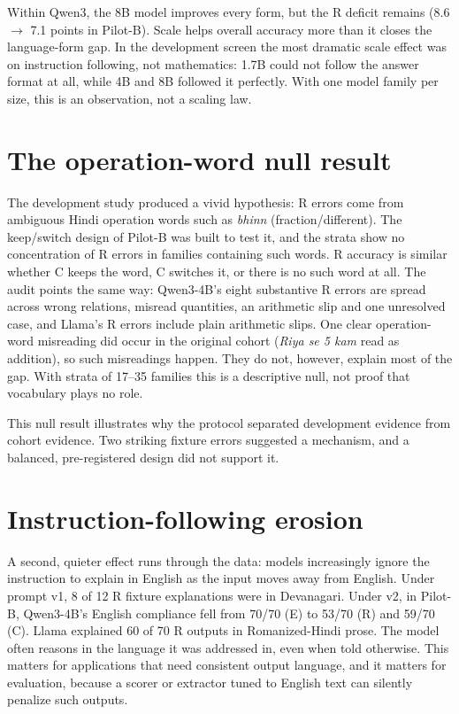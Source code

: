 \documentclass[12pt,a4paper,oneside]{report}
\renewcommand{\_}{\oldunderscore\allowbreak}
\begin{document}
Within Qwen3, the 8B model improves every form, but the R deficit remains (8.6 $\to$ 7.1 points in Pilot-B). Scale helps overall accuracy more than it closes the language-form gap. In the development screen the most dramatic scale effect was on instruction following, not mathematics: 1.7B could not follow the answer format at all, while 4B and 8B followed it perfectly. With one model family per size, this is an observation, not a scaling law.

\section{The operation-word null result}

The development study produced a vivid hypothesis: R errors come from ambiguous Hindi operation words such as \emph{bhinn} (fraction/different). The keep/switch design of Pilot-B was built to test it, and the strata show no concentration of R errors in families containing such words. R accuracy is similar whether C keeps the word, C switches it, or there is no such word at all. The audit points the same way: Qwen3-4B's eight substantive R errors are spread across wrong relations, misread quantities, an arithmetic slip and one unresolved case, and Llama's R errors include plain arithmetic slips. One clear operation-word misreading did occur in the original cohort (\emph{Riya se 5 kam} read as addition), so such misreadings happen. They do not, however, explain most of the gap. With strata of 17--35 families this is a descriptive null, not proof that vocabulary plays no role.

This null result illustrates why the protocol separated development evidence from cohort evidence. Two striking fixture errors suggested a mechanism, and a balanced, pre-registered design did not support it.

\section{Instruction-following erosion}

A second, quieter effect runs through the data: models increasingly ignore the instruction to explain in English as the input moves away from English. Under prompt v1, 8 of 12 R fixture explanations were in Devanagari. Under v2, in Pilot-B, Qwen3-4B's English compliance fell from 70/70 (E) to 53/70 (R) and 59/70 (C). Llama explained 60 of 70 R outputs in Romanized-Hindi prose. The model often reasons in the language it was addressed in, even when told otherwise. This matters for applications that need consistent output language, and it matters for evaluation, because a scorer or extractor tuned to English text can silently penalize such outputs.
\end{document}
